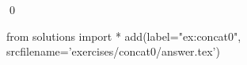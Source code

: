 
\begin{ex} 
  \label{ex:concat0}
  
  \qed
\end{ex} 
\begin{python0}
from solutions import *
add(label="ex:concat0",
    srcfilename='exercises/concat0/answer.tex') 
\end{python0}
